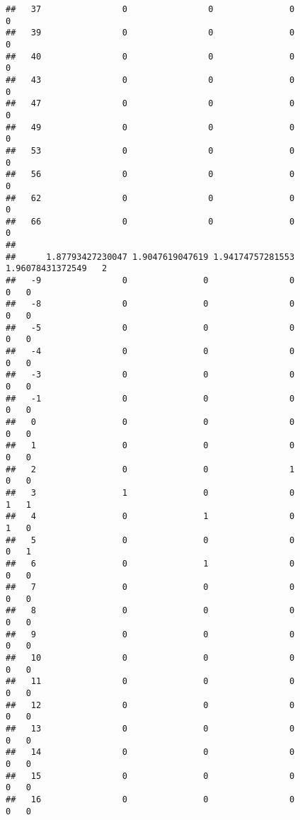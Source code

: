 \documentclass[]{article}
\begin{document}
\begin{verbatim}
##   37                0                0               0                0
##   39                0                0               0                0
##   40                0                0               0                0
##   43                0                0               0                0
##   47                0                0               0                0
##   49                0                0               0                0
##   53                0                0               0                0
##   56                0                0               0                0
##   62                0                0               0                0
##   66                0                0               0                0
##     
##      1.87793427230047 1.9047619047619 1.94174757281553 1.96078431372549   2
##   -9                0               0                0                0   0
##   -8                0               0                0                0   0
##   -5                0               0                0                0   0
##   -4                0               0                0                0   0
##   -3                0               0                0                0   0
##   -1                0               0                0                0   0
##   0                 0               0                0                0   0
##   1                 0               0                0                0   0
##   2                 0               0                1                0   0
##   3                 1               0                0                1   1
##   4                 0               1                0                1   0
##   5                 0               0                0                0   1
##   6                 0               1                0                0   0
##   7                 0               0                0                0   0
##   8                 0               0                0                0   0
##   9                 0               0                0                0   0
##   10                0               0                0                0   0
##   11                0               0                0                0   0
##   12                0               0                0                0   0
##   13                0               0                0                0   0
##   14                0               0                0                0   0
##   15                0               0                0                0   0
##   16                0               0                0                0   0

\end{verbatim}
\end{document}
